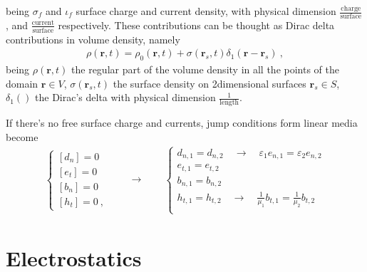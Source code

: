 \documentclass[letterpaper,10pt,italian]{jupyterBook}
\begin{document}
\sphinxAtStartPar
being \(\sigma_f\) and \(\iota_f\) surface charge and current density, with physical dimension \(\frac{\text{charge}}{\text{surface}}\), and \(\frac{\text{current}}{\text{surface}}\) respectively. These contributions can be thought as Dirac delta contributions in volume density, namely
\begin{equation*}
\begin{split}\rho(\mathbf{r},t) = \rho_0(\mathbf{r},t) + \sigma(\mathbf{r}_s,t) \delta_{1}(\mathbf{r}-\mathbf{r}_s) \ ,\end{split}
\end{equation*}
\sphinxAtStartPar
being \(\rho(\mathbf{r},t)\) the regular part of the volume density in all the points of the domain \(\mathbf{r} \in V\), \(\sigma(\mathbf{r}_s,t)\) the surface density on 2\sphinxhyphen{}dimensional surfaces \(\mathbf{r}_s \in S\), \(\delta_1()\) the Dirac’s delta with physical dimension \(\frac{1}{\text{length}}\).

\sphinxAtStartPar
If there’s no free surface charge and currents, jump conditions form linear media become
\begin{equation}\label{equation:ch/media:eq:em-jump:no-surf-density}
\begin{split}\begin{cases}
  [ d_n ] = 0 \\
  [ e_t ] = 0 \\
  [ b_n ] = 0 \\
  [ h_t ] = 0 \ ,
\end{cases}
\qquad \rightarrow \qquad
\begin{cases}
  d_{n,1} = d_{n,2}  \quad \rightarrow \quad \varepsilon_1 e_{n,1} = \varepsilon_2 e_{n,2} \\
  e_{t,1} = e_{t,2}  \\
  b_{n,1} = b_{n,2}  \\
  h_{t,1} = h_{t,2}  \quad \rightarrow \quad \frac{1}{\mu_1} b_{t,1} = \frac{1}{\mu_2} b_{t,2} \\
\end{cases}
\end{split}
\end{equation}
\sphinxstepscope


\chapter{Electrostatics}
\label{\detokenize{ch/electrostatics:electrostatics}}\label{\detokenize{ch/electrostatics:classical-electromagnetism-electrostatics}}\label{\detokenize{ch/electrostatics::doc}}
\end{document}
